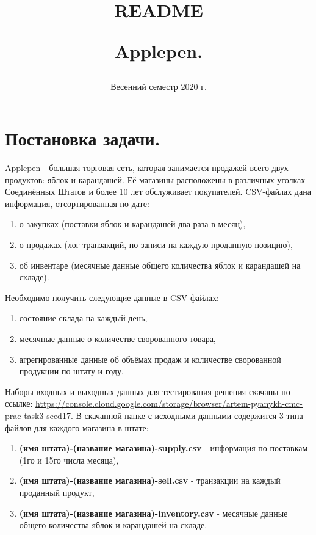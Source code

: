 \documentclass{article}
\title{README

Applepen.}
\date{Весенний семестр 2020 г.}
\begin{document}
\maketitle

\section{Постановка задачи.}
Applepen - большая торговая сеть, которая занимается продажей всего двух продуктов: яблок и карандашей. Её магазины расположены в различных уголках Соединённых Штатов и более 10 лет обслуживает покупателей.
 CSV-файлах дана информация, отсортированная по дате:
\begin{enumerate} 
\item о закупках (поставки яблок и карандашей два раза в месяц),
\item о продажах (лог транзакций, по записи на каждую проданную позицию),
\item об инвентаре (месячные данные общего количества яблок и карандашей на складе).
\end{enumerate} 
Необходимо получить следующие данные в CSV-файлах:
\begin{enumerate} 
\item состояние склада на каждый день,
\item месячные данные о количестве сворованного товара,
\item агрегированные данные об объёмах продаж и количестве сворованной продукции по штату и году.
\end{enumerate}
Наборы входных и выходных данных для тестирования решения скачаны по ссылке: \href{https://console.cloud.google.com/storage/browser/artem-pyanykh-cmc-prac-task3-seed17}
{https://console.cloud.google.com/storage/browser/artem-pyanykh-cmc-prac-task3-seed17}.
В скачанной папке с исходными данными содержится 3 типа файлов для каждого магазина в штате:
\begin{enumerate} 
\item \textbf{(имя штата)-(название магазина)-supply.csv} - информация по поставкам (1го и 15го числа месяца),
\item \textbf{(имя штата)-(название магазина)-sell.csv} - транзакции на каждый проданный продукт,
\item \textbf{(имя штата)-(название магазина)-inventory.csv} - месячные данные общего количества 
яблок и карандашей на складе.
\end{enumerate}
\end{document}
